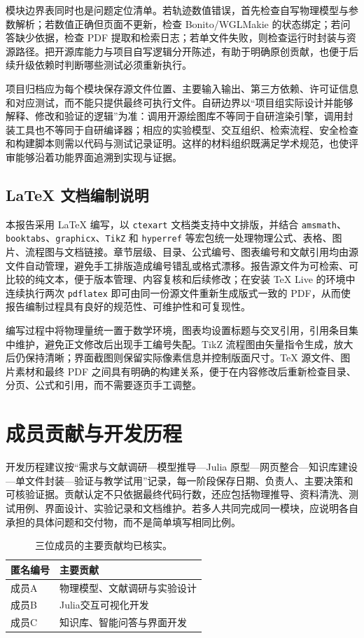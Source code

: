 \documentclass[UTF8,a4paper,zihao=-4]{ctexart}
\newcommand{\code}[1]{\texttt{#1}}
\begin{document}
模块边界表同时也是问题定位清单。若轨迹数值错误，首先检查自写物理模型与参数解析；若数值正确但页面不更新，检查 Bonito/WGLMakie 的状态绑定；若问答缺少依据，检查 PDF 提取和检索日志；若单文件失败，则检查运行时封装与资源路径。把开源库能力与项目自写逻辑分开陈述，有助于明确原创贡献，也便于后续升级依赖时判断哪些测试必须重新执行。

项目归档应为每个模块保存源文件位置、主要输入输出、第三方依赖、许可证信息和对应测试，而不能只提供最终可执行文件。自研边界以“项目组实际设计并能够解释、修改和验证的逻辑”为准：调用开源绘图库不等同于自研渲染引擎，调用封装工具也不等同于自研编译器；相应的实验模型、交互组织、检索流程、安全检查和构建脚本则需以代码与测试记录证明。这样的材料组织既满足学术规范，也使评审能够沿着功能界面追溯到实现与证据。

\subsection{\LaTeX{} 文档编制说明}
本报告采用 \LaTeX{} 编写，以 \code{ctexart} 文档类支持中文排版，并结合 \code{amsmath}、\code{booktabs}、\code{graphicx}、\code{TikZ} 和 \code{hyperref} 等宏包统一处理物理公式、表格、图片、流程图与文档链接。章节层级、目录、公式编号、图表编号和文献引用均由源文件自动管理，避免手工排版造成编号错乱或格式漂移。报告源文件为可检索、可比较的纯文本，便于版本管理、内容复核和后续修改；在安装 TeX Live 的环境中连续执行两次 \code{pdflatex} 即可由同一份源文件重新生成版式一致的 PDF，从而使报告编制过程具有良好的规范性、可维护性和可复现性。

编写过程中将物理量统一置于数学环境，图表均设置标题与交叉引用，引用条目集中维护，避免正文修改后出现手工编号失配。TikZ 流程图由矢量指令生成，放大后仍保持清晰；界面截图则保留实际像素信息并控制版面尺寸。TeX 源文件、图片素材和最终 PDF 之间具有明确的构建关系，便于在内容修改后重新检查目录、分页、公式和引用，而不需要逐页手工调整。

\section{成员贡献与开发历程}

开发历程建议按“需求与文献调研—模型推导—Julia 原型—网页整合—知识库建设—单文件封装—验证与教学试用”记录，每一阶段保存日期、负责人、主要决策和可核验证据。贡献认定不只依据最终代码行数，还应包括物理推导、资料清洗、测试用例、界面设计、实验记录和文档维护。若多人共同完成同一模块，应说明各自承担的具体问题和交付物，而不是简单填写相同比例。

\begin{table}[H]
\centering
\begin{tabularx}{0.88\textwidth}{>{\centering\arraybackslash}p{2.2cm}>{\centering\arraybackslash}X}
\toprule
匿名编号 & 主要贡献\\
\midrule
成员A & 物理模型、文献调研与实验设计\\
成员B & Julia交互可视化开发\\
成员C & 知识库、智能问答与界面开发\\
\bottomrule
\end{tabularx}
\caption{三位成员的主要贡献均已核实。}
\end{table}
\end{document}
